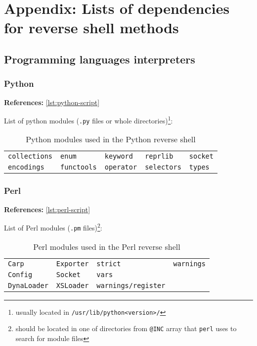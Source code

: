 \newcommand{\references}[1]{\noindent \textbf{References:} \cref{#1}}

\renewcommand{\tablename}{List}
\setlength{\tabcolsep}{15pt}


\chapter*{Appendix: Lists of dependencies for reverse shell methods}

\section*{Programming languages interpreters}

\subsection*{Python}

\references{lst:python-script}

List of python modules (\texttt{.py} files or whole directories)\footnote{usually located in \texttt{/usr/lib/python<version>/}}:

\begin{longtable}{l l l l l}
\caption{Python modules used in the Python reverse shell}\label{tab:python-dpd} \\
\texttt{collections} & \texttt{enum} & \texttt{keyword} & \texttt{reprlib} & \texttt{socket} \\
\texttt{encodings} & \texttt{functools} & \texttt{operator} & \texttt{selectors} & \texttt{types} \\
\end{longtable}


\subsection*{Perl}

\references{lst:perl-script}

List of Perl modules (\texttt{.pm} files)\footnote{should be located in one of directories from \texttt{@INC} array that \texttt{perl} uses to search for module files}:

\begin{longtable}{l l l l}
\caption{Perl modules used in the Perl reverse shell}\label{tab:perl-dpd} \\
\texttt{Carp} & \texttt{Exporter} & \texttt{strict} & \texttt{warnings} \\
\texttt{Config} & \texttt{Socket} & \texttt{vars} \\
\texttt{DynaLoader} & \texttt{XSLoader} & \texttt{warnings/register} \\
\end{longtable}


